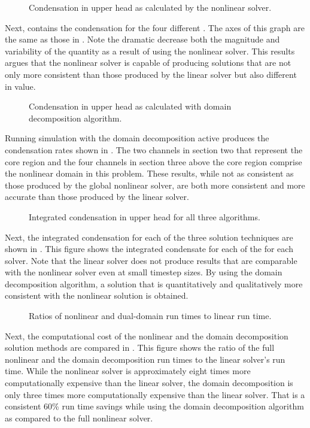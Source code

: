 \begin{figure}[h!tb]
\centering

\caption{Condensation in upper head as calculated by the nonlinear solver.}
\label{fig:refillGammaNln}
\end{figure}

Next,  contains the condensation for the four different \dtmax{}.
The axes of this graph are the same as those in .
Note the dramatic decrease both the magnitude and variability of the quantity as a result of using the nonlinear solver.
This results argues that the nonlinear solver is capable of producing solutions that are not only  more consistent than those produced by the linear solver but also different in value.

\begin{figure}[h!tb]
\centering

\caption{Condensation in upper head as calculated with domain decomposition algorithm.}
\label{fig:refillGammaDom}
\end{figure}

Running simulation with the domain decomposition active produces the condensation rates shown in .
The two channels in section two that represent the core region and the four channels in section three above the core region comprise the nonlinear domain in this problem.
These results, while not as consistent as those produced by the global nonlinear solver, are both more consistent and more accurate than those produced by the linear solver.

\begin{figure}[t!hb]
\centering

\caption{Integrated condensation in upper head for all three algorithms.}
\label{fig:refillMaxGamma}
\end{figure}

Next, the integrated condensation for each of the three solution techniques are shown in .
This figure shows the integrated condensate for each of the \dtmax{} for each solver.
Note that the linear solver does not produce results that are comparable with the nonlinear solver even at small timestep sizes.
By using the domain decomposition algorithm, a solution that is quantitatively and qualitatively more consistent with the nonlinear solution is obtained.

\begin{figure}[h!tb]
\centering

\caption{Ratios of nonlinear and dual-domain run times to linear run time.}
\label{fig:refillRunTimeRatios}
\end{figure}

Next, the computational cost of the nonlinear and the domain decomposition solution methods are compared in .
This figure shows the ratio of the full nonlinear and the domain decomposition run times to the linear solver's run time.
While the nonlinear solver is approximately eight times more computationally expensive than the linear solver, the domain decomposition is only three times more computationally expensive than the linear solver.
That is a consistent 60\% run time savings while using the domain decomposition algorithm as compared to the full nonlinear solver.